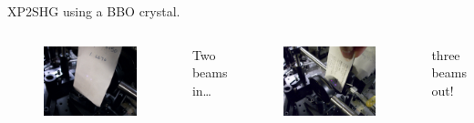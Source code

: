 \documentclass{beamer}
\begin{document}
\begin{frame}
\begin{center}
XP2SHG using a BBO crystal.
\end{center}
\begin{columns}
\begin{figure}
\centering
\includegraphics[width=\textwidth]{xp2_pic1}
\end{figure}
\begin{center}
Two beams in\ldots
\end{center}
\begin{figure}
\centering
\includegraphics[width=\textwidth]{xp2_pic2}
\end{figure}
\begin{center}
three beams out!
\end{center}
\end{columns}
\end{frame}
\end{document}
